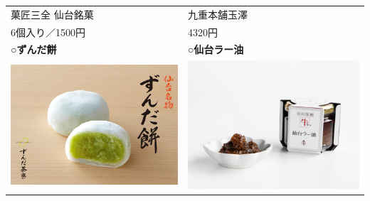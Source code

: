 \begin{table}[H]
\begin{tabular}{ll}
		\begin{minipage}{0.45\textwidth}
			\centering
			{\scriptsize{菓匠三全 仙台銘菓}}
		\end{minipage} & 
		\begin{minipage}{0.45\textwidth}
			\centering
			{\scriptsize{九重本舗玉澤}}
		\end{minipage} \\
		\begin{minipage}{0.45\textwidth}
			\centering
			{\scriptsize{6個入り／1500円}}
		\end{minipage} & 
		\begin{minipage}{0.45\textwidth}
			\centering
			{\scriptsize{4320円}}
		\end{minipage} \\
		\textbf{○ずんだ餅} & \textbf{○仙台ラー油} \\
		\begin{minipage}{0.45\textwidth}
			\centering
			\includegraphics[width=0.7\linewidth]{img/zunda}
		\end{minipage} &
		\begin{minipage}{0.45\textwidth}
			\centering
			\includegraphics[width=0.7\linewidth]{img/ra-yu}
		\end{minipage} \\

\end{tabular}
\end{table}
